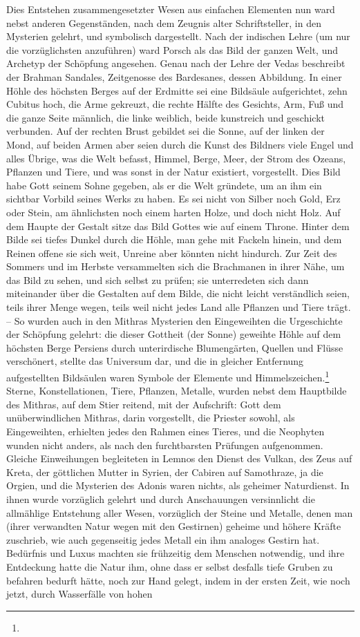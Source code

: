 \documentclass[a4paper, 11pt, oneside, polutonikogreek, german]{article}
\begin{document}
Dies Entstehen zusammengesetzter Wesen aus einfachen Elementen nun ward nebst anderen Gegenständen, nach dem Zeugnis alter Schriftsteller, in den Mysterien gelehrt, und symbolisch dargestellt. Nach der indischen Lehre (um nur die vorzüglichsten anzuführen) ward Porsch als das Bild der ganzen Welt, und Archetyp der Schöpfung angesehen. Genau nach der Lehre der Vedas beschreibt der Brahman Sandales, Zeitgenosse des Bardesanes, dessen Abbildung. In einer Höhle des höchsten Berges auf der Erdmitte sei eine Bildsäule aufgerichtet, zehn Cubitus hoch, die Arme gekreuzt, die rechte Hälfte des Gesichts, Arm, Fuß und die ganze Seite männlich, die linke weiblich, beide kunstreich und geschickt verbunden. Auf der rechten Brust gebildet sei die Sonne, auf der linken der Mond, auf beiden Armen aber seien durch die Kunst des Bildners viele Engel und alles Übrige, was die Welt befasst, Himmel, Berge, Meer, der Strom des Ozeans, Pflanzen und Tiere, und was sonst in der Natur existiert, vorgestellt. Dies Bild habe Gott seinem Sohne gegeben, als er die Welt gründete, um an ihm ein sichtbar Vorbild seines Werks zu haben. Es sei nicht von Silber noch Gold, Erz oder Stein, am ähnlichsten noch einem harten Holze, und doch nicht Holz. Auf dem Haupte der Gestalt sitze das Bild Gottes wie auf einem Throne. Hinter dem Bilde sei tiefes Dunkel durch die Höhle, man gehe mit Fackeln hinein, und dem Reinen offene sie sich weit, Unreine aber könnten nicht hindurch. Zur Zeit des Sommers und im Herbste versammelten sich die Brachmanen in ihrer Nähe, um das Bild zu sehen, und sich selbst zu prüfen; sie unterredeten sich dann miteinander über die Gestalten auf dem Bilde, die nicht leicht verständlich seien, teils ihrer Menge wegen, teils weil nicht jedes Land alle Pflanzen und Tiere trägt. -- So wurden auch in den Mithras Mysterien den Eingeweihten die Urgeschichte der Schöpfung gelehrt: die dieser Gottheit (der Sonne) geweihte Höhle auf dem höchsten Berge Persiens durch unterirdische Blumengärten, Quellen und Flüsse verschönert, stellte das Universum dar, und die in gleicher Entfernung aufgestellten Bildsäulen waren Symbole der Elemente und Himmelszeichen.\footnote{} Sterne, Konstellationen, Tiere, Pflanzen, Metalle, wurden nebst dem Hauptbilde des Mithras, auf dem Stier reitend, mit der Aufschrift: Gott dem unüberwindlichen Mithras, darin vorgestellt, die Priester sowohl, als Eingeweihten, erhielten jedes den Rahmen eines Tieres, und die Neophyten wunden nicht anders, als nach den furchtbarsten Prüfungen aufgenommen. Gleiche Einweihungen begleiteten in Lemnos den Dienst des Vulkan, des Zeus auf Kreta, der göttlichen Mutter in Syrien, der Cabiren auf Samothraze, ja die Orgien, und die Mysterien des Adonis waren nichts, als geheimer Naturdienst. In ihnen wurde vorzüglich gelehrt und durch Anschauungen versinnlicht die allmählige Entstehung aller Wesen, vorzüglich der Steine und Metalle, denen man (ihrer verwandten Natur wegen mit den Gestirnen) geheime und höhere Kräfte zuschrieb, wie auch gegenseitig jedes Metall ein ihm analoges Gestirn hat. Bedürfnis und Luxus machten sie frühzeitig dem Menschen notwendig, und ihre Entdeckung hatte die Natur ihm, ohne dass er selbst desfalls tiefe Gruben zu befahren bedurft hätte, noch zur Hand gelegt, indem in der ersten Zeit, wie noch jetzt, durch Wasserfälle von hohen 
\end{document}
